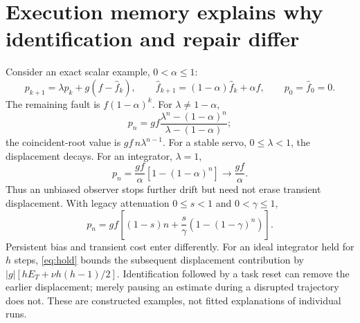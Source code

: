 \documentclass[11pt]{article}
\begin{document}
\section{Execution memory explains why identification and repair differ}
Consider an exact scalar example, $0<\alpha\le1$:
\[
p_{k+1}=\lambda p_k+g(f-\hat f_k),\qquad
\hat f_{k+1}=(1-\alpha)\hat f_k+\alpha f,\qquad p_0=\hat f_0=0.
\]
The remaining fault is $f(1-\alpha)^k$. For $\lambda\ne1-\alpha$,
\begin{equation}
p_n=gf\frac{\lambda^n-(1-\alpha)^n}{\lambda-(1-\alpha)};
\end{equation}
the coincident-root value is $gf\,n\lambda^{n-1}$.
For a stable servo, $0\le\lambda<1$, the displacement decays. For an
integrator, $\lambda=1$,
\begin{equation}
p_n=\frac{gf}{\alpha}[1-(1-\alpha)^n]\longrightarrow\frac{gf}{\alpha}.
\label{eq:transient-cost}
\end{equation}
Thus an unbiased observer stops further drift but need not erase transient
displacement. With legacy attenuation $0\le s<1$ and $0<\gamma\le1$,
\begin{equation}
p_n=gf\left[(1-s)n+\frac{s}{\gamma}
                   (1-(1-\gamma)^n)\right].
\end{equation}
Persistent bias and transient cost enter differently. For an ideal
integrator held for $h$ steps, \eqref{eq:hold} bounds the subsequent
displacement contribution by
$|g|[hE_T+\nu h(h-1)/2]$.
Identification followed by a task reset can remove the earlier displacement;
merely pausing an estimate during a disrupted trajectory does not.
These are constructed examples, not fitted explanations of individual runs.
\end{document}
